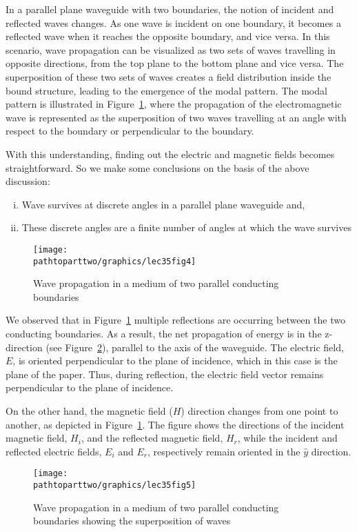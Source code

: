 In a parallel plane waveguide with two boundaries, the notion of incident and reflected waves changes. As one wave is incident on one boundary, it becomes a reflected wave when it reaches the opposite boundary, and vice versa. In this scenario, wave propagation can be visualized as two sets of waves travelling in opposite directions, from the top plane to the bottom plane and vice versa. The superposition of these two sets of waves creates a field distribution inside the bound structure, leading to the emergence of the modal pattern. The modal pattern is illustrated in Figure~\ref{fig:lec35fig4}, where the propagation of the electromagnetic wave is represented as the superposition of two waves travelling at an angle with respect to the boundary or perpendicular to the boundary.

With this understanding, finding out the electric and magnetic fields becomes straightforward. So we make some conclusions on the basis of the above discussion:
\begin{enumerate}[(i)]
\item Wave survives at discrete angles in a parallel plane waveguide and,
\item These discrete angles are a finite number of angles at which the wave survives
\end{enumerate}
\begin{figure}[h]
\centering
\texttt{[image: \\pathtoparttwo/graphics/lec35fig4]}
\caption{Wave propagation in a medium of two parallel conducting boundaries}
\label{fig:lec35fig4}
\end{figure}

We observed that in Figure~\ref{fig:lec35fig4} multiple reflections are occurring between the two conducting boundaries. As a result, the net propagation of energy is in the z-direction (see Figure~\ref{fig:lec35fig5}), parallel to the axis of the waveguide. The electric field, $E$, is oriented perpendicular to the plane of incidence, which in this case is the plane of the paper. Thus, during reflection, the electric field vector remains perpendicular to the plane of incidence.

On the other hand, the magnetic field ($H$) direction changes from one point to another, as depicted in Figure~\ref{fig:lec35fig4}. The figure shows the directions of the incident magnetic field, $H_i$, and the reflected magnetic field, $H_r$, while the incident and reflected electric fields, $E_i$ and $E_r$, respectively remain oriented in the $\hat{y}$ direction.
\begin{figure}[h]
\centering
\texttt{[image: \\pathtoparttwo/graphics/lec35fig5]}
\caption{Wave propagation in a medium of two parallel conducting boundaries showing the superposition of waves}
\label{fig:lec35fig5}
\end{figure}

